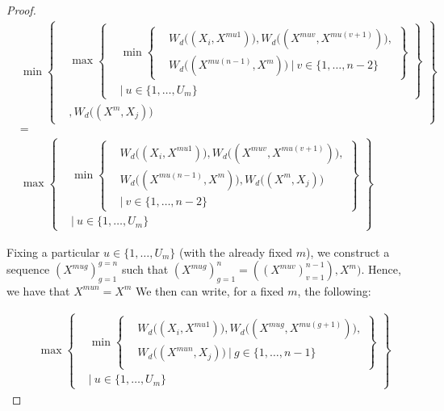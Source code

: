 \documentclass{article} %
\theoremstyle{style1}
\theoremstyle{style1}
\theoremstyle{example}
\begin{document}
\begin{proof}
\[
\begin{aligned}
&\min
      \left\{
      \begin{aligned}
        &\max
          \left\{
          \begin{aligned}
            &\min\left\{
            \begin{aligned}
            &W_d\big((X_i,X^{mu1})\big), W_d\big((X^{muv},X^{mu(v+1)})\big), \\
            &W_d\big((X^{mu(n-1)},X^m)\big)\ |\ v\in\{1,\ldots,n-2\}
            \end{aligned}
            \right\} \\
            &|\ u\in\{1,\ldots,U_m\}
          \end{aligned}
          \right\} \\
          &, W_d\big((X^m,X_j)\big)
      \end{aligned}
      \right\} \\
      &= \\
&\max
          \left\{
          \begin{aligned}
            &\min\left\{
            \begin{aligned}
            &W_d\big((X_i,X^{mu1})\big), W_d\big((X^{muv},X^{mu(v+1)})\big), \\
            &W_d\big((X^{mu(n-1)},X^m)\big), W_d\big((X^m,X_j)\big)\ \\
            &|\ v\in\{1,\ldots,n-2\}
            \end{aligned}
            \right\} \\
            &|\ u\in\{1,\ldots,U_m\}
          \end{aligned}
          \right\}
\end{aligned}
\]

Fixing a particular $u\in\{1,\ldots,U_m\}$ (with the already fixed $m$), we construct a sequence $(X^{mug})_{g=1}^{g=n}$ such that $(X^{mug})_{g=1}^n=((X^{muv})_{v=1}^{n-1}),X^m)$. Hence, we have that $X^{mun}=X^m$ We then can write, for a fixed $m$, the following:

\[
\begin{aligned}
&\max
          \left\{
          \begin{aligned}
            &\min\left\{
            \begin{aligned}
            &W_d\big((X_i,X^{mu1})\big), W_d\big((X^{mug},X^{mu(g+1)})\big), \\
            &W_d\big((X^{mun},X_j)\big)\ |\ g\in\{1,\ldots,n-1\}\\
            \end{aligned}
            \right\} \\
            &|\ u\in\{1,\ldots,U_m\}
          \end{aligned}
          \right\}
\end{aligned}
\]




\end{proof}
\end{document}
